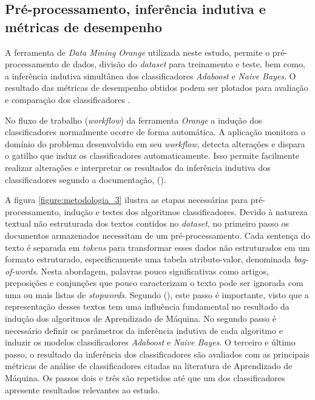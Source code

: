 

\subsection{Pré-processamento, inferência indutiva e métricas de desempenho}
\label{subsection:pre_processamento}

A ferramenta de \textit{Data Mining} \textit{Orange} utilizada neste estudo, 
permite o pré-processamento de dados, divisão do \textit{dataset} para 
treinamento e teste, bem como, a inferência indutiva simultânea dos 
classificadores \textit{Adaboost} e \textit{Naive Bayes}. O resultado das 
métricas de desempenho obtidos podem ser plotados para avaliação e comparação 
dos classificadores \cite{wahbeh2011comparison}.

No fluxo de trabalho (\textit{workflow}) da ferramenta \textit{Orange} a 
indução dos classificadores normalmente ocorre de forma automática. A aplicação
monitora o domínio do problema desenvolvido em seu \textit{workflow}, detecta 
alterações e dispara o gatilho que induz os classificadores automaticamente. 
Isso permite facilmente realizar alterações e interpretar os resultados da 
inferência indutiva dos classificadores segundo a documentação, 
 (\citeyear{orange_documentation}). 

A figura \ref{figure:metodologia_3} ilustra as etapas necessárias para 
pré-processamento, indução e testes dos algoritmos classificadores. Devido à 
natureza textual não estruturada dos textos contidos no \textit{dataset}, no 
primeiro passo os documentos armazenados necessitam de um pré-processamento. 
Cada sentença do texto é separada em \textit{tokens} para transformar esses 
dados não estruturados em um formato estruturado, especificamente uma tabela 
atributo-valor, denominada \textit{bag-of-words}. Nesta abordagem, palavras 
pouco significativas como artigos, preposições e conjunções que pouco 
caracterizam o texto pode ser ignorada com uma ou mais listas de 
\textit{stopwords}. Segundo  
(\citeyear{matsubara2003pretext}), este passo é importante, visto que a 
representação desses textos tem uma influência fundamental no resultado da 
indução dos algoritmos de Aprendizado de Máquina. No segundo passo é 
necessário definir os parâmetros da inferência indutiva de cada algoritmo e 
induzir os modelos classificadores \textit{Adaboost} e \textit{Naive Bayes}. 
O terceiro e último passo, o resultado da inferência dos classificadores são 
avaliados com as principais métricas de análise de classificadores citadas na 
literatura de Aprendizado de Máquina. Os passos dois e três são repetidos até 
que um dos classificadores apresente resultados relevantes ao estudo.

